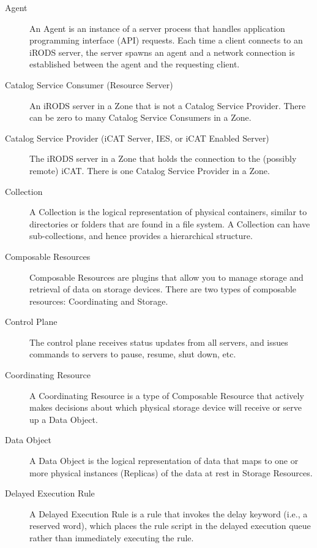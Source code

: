 \documentclass[10pt,oneside]{memoir}
\begin{document}
\begin{description}

\item [Agent]
An Agent is an instance of a server process that handles application programming interface (API) requests. Each time a client connects to an iRODS server, the server spawns an agent and a network connection is established between the agent and the requesting client.

\item [Catalog Service Consumer (Resource Server)]
An iRODS server in a Zone that is not a Catalog Service Provider.  There can be zero to many Catalog Service Consumers in a Zone.

\item [Catalog Service Provider (iCAT Server, IES, or iCAT Enabled Server)]
The iRODS server in a Zone that holds the connection to the (possibly remote) iCAT. There is one Catalog Service Provider in a Zone.

\item [Collection]
A Collection is the logical representation of physical containers, similar to directories or folders that are found in a file system. A Collection can have sub-collections, and hence provides a hierarchical structure.

\item [Composable Resources]
Composable Resources are plugins that allow you to manage storage and retrieval of data on storage devices. There are two types of composable resources: Coordinating and Storage.

\item [Control Plane]
The control plane receives status updates from all servers, and issues commands to servers to pause, resume, shut down, etc.

\item [Coordinating Resource]
A Coordinating Resource is a type of Composable Resource that actively makes decisions about which physical storage device will receive or serve up a Data Object.

\item [Data Object]
A Data Object is the logical representation of data that maps to one or more physical instances (Replicas) of the data at rest in Storage Resources.

\item [Delayed Execution Rule]
A Delayed Execution Rule is a rule that invokes the delay keyword (i.e., a reserved word), which places the rule script in the delayed execution queue rather than immediately executing the rule.


\end{description}
\end{document}
